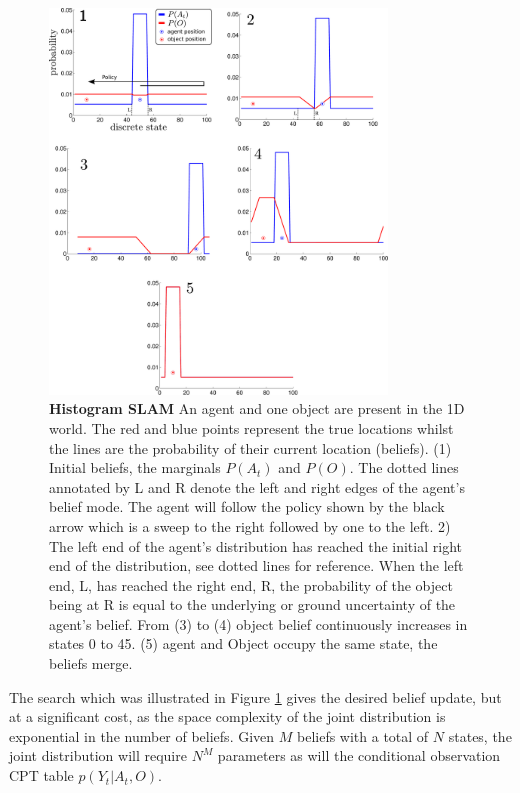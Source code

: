 \begin{figure}
\centering
  \includegraphics[width=0.8\textwidth]{./ch5-MLMF/Figures/Figure3.pdf}
 \caption{\textbf{Histogram SLAM} An agent and one object are present in the 1D world. The red and blue points represent the true
 locations whilst the lines are the probability of their current location (beliefs).
 (1) Initial beliefs, the marginals $P(A_t)$ and $P(O)$.
 The dotted lines annotated by L and R denote the left and right edges of the agent's belief mode. The agent will follow the policy
 shown by the black arrow which is a sweep to the right followed by one to the left.
 2) The left end of the agent's distribution has reached the initial right end of the distribution, see dotted lines for reference. When the left end, L,
 has reached the right end, R, the probability of the object being at R is equal to the underlying or ground uncertainty of the agent's belief. 
 From (3) to (4) object belief continuously increases in states 0 to 45.
 (5) agent and Object occupy the same state, the beliefs merge.}
 \label{fig:discrete_example}
\end{figure}

The search which was illustrated in Figure \ref{fig:discrete_example} gives the desired belief update, but at a significant cost, as the 
space complexity of the joint distribution is exponential in the number of beliefs. Given $M$ beliefs with
a total of $N$ states, the joint distribution will require $N^M$ parameters as will the conditional observation CPT table
$p(Y_t|A_t,O)$. 

